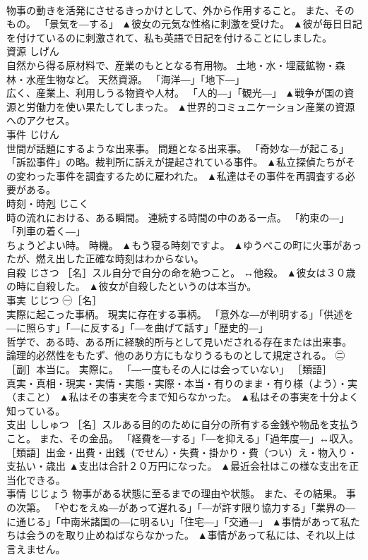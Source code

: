 \documentclass[8pt]{extreport}
\begin{document}
\begin{CJK}{UTF8}{min}
\\	物事の動きを活発にさせるきっかけとして、外から作用すること。 また、そのもの。 「景気を―する」	▲彼女の元気な性格に刺激を受けた。 ▲彼が毎日日記を付けているのに刺激されて、私も英語で日記を付けることにしました。
\\	資源	しげん	
\\	自然から得る原材料で、産業のもととなる有用物。 土地・水・埋蔵鉱物・森林・水産生物など。 天然資源。 「海洋―」「地下―」 
\\	広く、産業上、利用しうる物資や人材。 「人的―」「観光―」	▲戦争が国の資源と労働力を使い果たしてしまった。 ▲世界的コミュニケーション産業の資源へのアクセス。
\\	事件	じけん	
\\	世間が話題にするような出来事。 問題となる出来事。 「奇妙な―が起こる」 
\\	「訴訟事件」の略。裁判所に訴えが提起されている事件。	▲私立探偵たちがその変わった事件を調査するために雇われた。 ▲私達はその事件を再調査する必要がある。
\\	時刻・時剋	じこく	
\\	時の流れにおける、ある瞬間。 連続する時間の中のある一点。 「約束の―」「列車の着く―」 
\\	ちょうどよい時。 時機。	▲もう寝る時刻ですよ。 ▲ゆうべこの町に火事があったが、燃え出した正確な時刻はわからない。
\\	自殺	じさつ	［名］スル自分で自分の命を絶つこと。 ↔他殺。	▲彼女は３０歳の時に自殺した。 ▲彼女が自殺したというのは本当か。
\\	事実	じじつ	㊀［名］ 
\\	実際に起こった事柄。 現実に存在する事柄。 「意外な―が判明する」「供述を―に照らす」「―に反する」「―を曲げて話す」「歴史的―」 
\\	哲学で、ある時、ある所に経験的所与として見いだされる存在または出来事。 論理的必然性をもたず、他のあり方にもなりうるものとして規定される。 ㊁［副］本当に。 実際に。 「―一度もその人には会っていない」 ［類語］ 
\\	真実・真相・現実・実情・実態・実際・本当・有りのまま・有り様（よう）・実（まこと）	▲私はその事実を今まで知らなかった。 ▲私はその事実を十分よく知っている。
\\	支出	ししゅつ	［名］スルある目的のために自分の所有する金銭や物品を支払うこと。 また、その金品。 「経費を―する」「―を抑える」「過年度―」↔収入。 ［類語］出金・出費・出銭（でせん）・失費・掛かり・費（つい）え・物入り・支払い・歳出	▲支出は合計２０万円になった。 ▲最近会社はこの様な支出を正当化できる。
\\	事情	じじょう	物事がある状態に至るまでの理由や状態。 また、その結果。 事の次第。 「やむをえぬ―があって遅れる」「―が許す限り協力する」「業界の―に通じる」「中南米諸国の―に明るい」「住宅―」「交通―」	▲事情があって私たちは会うのを取り止めねばならなかった。 ▲事情があって私には、それ以上は言えません。

\end{CJK}
\end{document}
